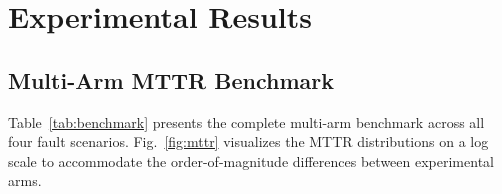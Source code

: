 \documentclass[journal,10pt,twoside]{IEEEtran}
\begin{document}
\section{Experimental Results}\label{sec:results}

\subsection{Multi-Arm MTTR Benchmark}

Table~\ref{tab:benchmark} presents the complete multi-arm benchmark across
all four fault scenarios. Fig.~\ref{fig:mttr} visualizes the MTTR
distributions on a log scale to accommodate the order-of-magnitude
differences between experimental arms.
\end{document}
